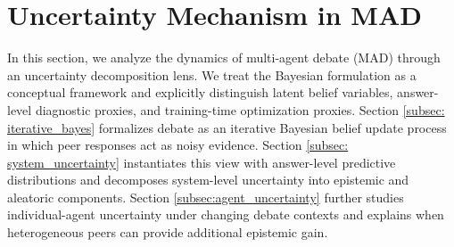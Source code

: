 \documentclass{article}
\theoremstyle{plain}
\theoremstyle{definition}
\theoremstyle{remark}
\begin{document}
\section{Uncertainty Mechanism in MAD}
\label{sec:theory}


In this section, we analyze the dynamics of multi-agent debate (MAD) through an uncertainty decomposition lens. We treat the Bayesian formulation as a conceptual framework and explicitly distinguish latent belief variables, answer-level diagnostic proxies, and training-time optimization proxies. Section \ref{subsec: iterative_bayes} formalizes debate as an iterative Bayesian belief update process in which peer responses act as noisy evidence. Section \ref{subsec: system_uncertainty} instantiates this view with answer-level predictive distributions and decomposes system-level uncertainty into epistemic and aleatoric components. Section \ref{subsec:agent_uncertainty} further studies individual-agent uncertainty under changing debate contexts and explains when heterogeneous peers can provide additional epistemic gain.
\end{document}
